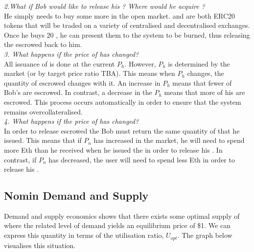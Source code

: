 \noindent \emph{2.What if Bob would like to release his \HAV{}? Where would he acquire \NOM{}?} \\ 

\noindent He simply needs to buy some more in the open market. \HAV{} and \NOM{} are both ERC20 tokens that will be traded on a variety of centralised and decentralised exchanges. Once he buys $20$ \NOM{}, he can present them to the system to be burned, thus releasing the escrowed \HAV{} back to him. \\ 

\noindent \emph{3. What happens if the price of \HAV{} has changed?} \\

\noindent All issuance of \NOM{} is done at the current $P_h$. However, $P_h$ is determined by the market (or by target price ratio TBA). This means when $P_h$ changes, the quantity of escrowed \HAV{} changes with it. An increase in $P_h$ means that fewer of Bob's \HAV{} are escrowed. In contrast, a decrease in the $P_h$ means that more of his \HAV{} are escrowed. This process occurs automatically in order to ensure that the system remains overcollateralised. \\ 

\noindent \emph{4. What happens if the price of \NOM{} has changed?} \\ 

\noindent In order to release escrowed \HAV{} the Bob must return the same quantity of \NOM{} that he issued. This means that if $P_n$ has increased in the market, he will need to spend more Eth than he received when he issued the \NOM{} in order to release his \HAV{}. In contrast, if $P_n$ has decreased, the user will need to spend less Eth in order to release his \HAV{}.

\newpage

\subsection{Nomin Demand and Supply} 

\noindent Demand and supply economics shows that there exists some optimal supply of \NOM{} where the related level of demand yields an equilibrium price of \$1. We can express this quantity in terms of the utilisation ratio, $U_{opt}$. The graph below visualises this situation. \\

